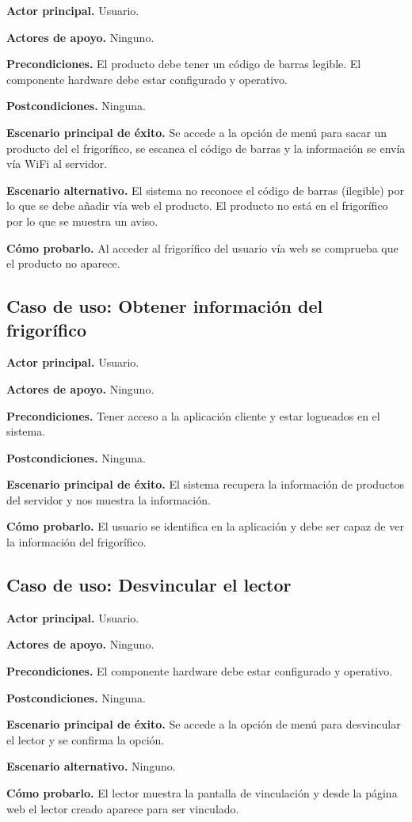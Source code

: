     \textbf{Actor principal.} Usuario.

    \textbf{Actores de apoyo.} Ninguno.

    \textbf{Precondiciones.} El producto debe tener un código de barras legible. El componente hardware debe estar configurado y operativo.

    \textbf{Postcondiciones.} Ninguna.

    \textbf{Escenario principal de éxito.} Se accede a la opción de menú para sacar un producto del el frigorífico, se escanea el código de barras y la información se envía vía WiFi al servidor.

    \textbf{Escenario alternativo.} El sistema no reconoce el código de barras (ilegible) por lo que se debe añadir vía web el producto. El producto no está en el frigorífico por lo que se muestra un aviso.

    \textbf{Cómo probarlo.} Al acceder al frigorífico del usuario vía web se comprueba que el producto no aparece.

\subsection{Caso de uso: Obtener información del frigorífico}

    \textbf{Actor principal.} Usuario.

    \textbf{Actores de apoyo.} Ninguno.

    \textbf{Precondiciones.} Tener acceso a la aplicación cliente y estar logueados en el sistema.

    \textbf{Postcondiciones.} Ninguna.

    \textbf{Escenario principal de éxito.} El sistema recupera la información de productos del servidor y nos muestra la información.

    \textbf{Cómo probarlo.} El usuario se identifica en la aplicación y debe ser capaz de ver la información del frigorífico.

\subsection{Caso de uso: Desvincular el lector}

    \textbf{Actor principal.} Usuario.

    \textbf{Actores de apoyo.} Ninguno.

    \textbf{Precondiciones.} El componente hardware debe estar configurado y operativo.

    \textbf{Postcondiciones.} Ninguna.

    \textbf{Escenario principal de éxito.} Se accede a la opción de menú para desvincular el lector y se confirma la opción.

    \textbf{Escenario alternativo.} Ninguno.

    \textbf{Cómo probarlo.} El lector muestra la pantalla de vinculación y desde la página web el lector creado aparece para ser vinculado.